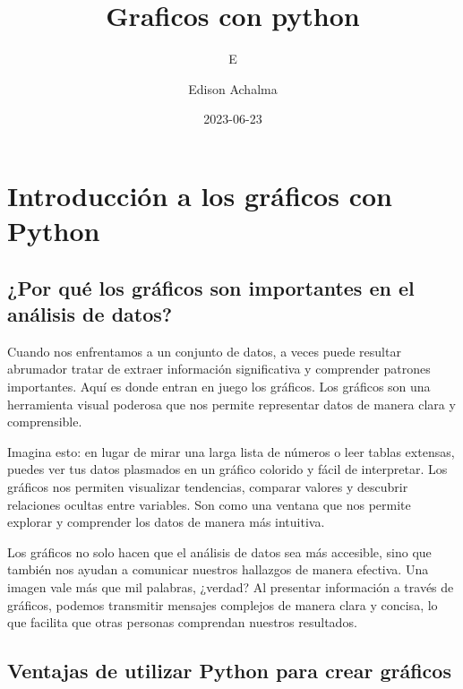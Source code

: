 \documentclass[
  a4paper,
]{article}
\title{Graficos con python}
\subtitle{E}
\author{Edison Achalma}
\date{2023-06-23}
\begin{document}
\maketitle
\ifdefined\Shaded\renewenvironment{Shaded}{\begin{tcolorbox}[sharp corners, interior hidden, frame hidden, breakable, enhanced, borderline west={3pt}{0pt}{shadecolor}, boxrule=0pt]}{\end{tcolorbox}}\fi

\hypertarget{introducciuxf3n-a-los-gruxe1ficos-con-python}{%
\section{Introducción a los gráficos con
Python}\label{introducciuxf3n-a-los-gruxe1ficos-con-python}}

\hypertarget{por-quuxe9-los-gruxe1ficos-son-importantes-en-el-anuxe1lisis-de-datos}{%
\subsection{¿Por qué los gráficos son importantes en el análisis de
datos?}\label{por-quuxe9-los-gruxe1ficos-son-importantes-en-el-anuxe1lisis-de-datos}}

Cuando nos enfrentamos a un conjunto de datos, a veces puede resultar
abrumador tratar de extraer información significativa y comprender
patrones importantes. Aquí es donde entran en juego los gráficos. Los
gráficos son una herramienta visual poderosa que nos permite representar
datos de manera clara y comprensible.

Imagina esto: en lugar de mirar una larga lista de números o leer tablas
extensas, puedes ver tus datos plasmados en un gráfico colorido y fácil
de interpretar. Los gráficos nos permiten visualizar tendencias,
comparar valores y descubrir relaciones ocultas entre variables. Son
como una ventana que nos permite explorar y comprender los datos de
manera más intuitiva.

Los gráficos no solo hacen que el análisis de datos sea más accesible,
sino que también nos ayudan a comunicar nuestros hallazgos de manera
efectiva. Una imagen vale más que mil palabras, ¿verdad? Al presentar
información a través de gráficos, podemos transmitir mensajes complejos
de manera clara y concisa, lo que facilita que otras personas comprendan
nuestros resultados.

\hypertarget{ventajas-de-utilizar-python-para-crear-gruxe1ficos}{%
\subsection{Ventajas de utilizar Python para crear
gráficos}\label{ventajas-de-utilizar-python-para-crear-gruxe1ficos}}
\end{document}
